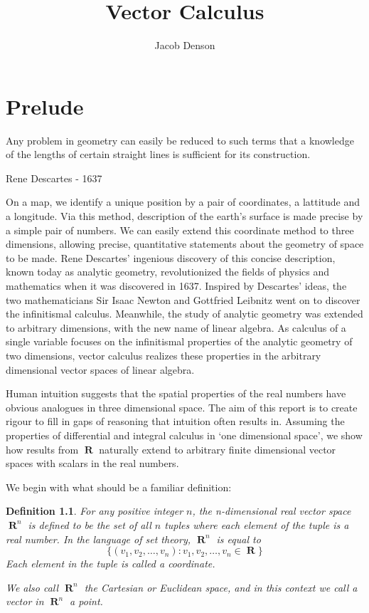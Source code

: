 \documentclass{report}
\title{Vector Calculus}
\author{Jacob Denson}
\newtheorem{definition}{Definition}
\DeclareMathOperator{\real}{\mathbf{R}}
\begin{document}
\maketitle










\chapter{Prelude}

\epigraph{Any problem in geometry can easily be reduced to such terms that a knowledge of the lengths of certain straight lines is sufficient for its construction.}{Rene Descartes - 1637}

On a map, we identify a unique position by a pair of coordinates, a lattitude and a longitude. Via this method, description of the earth's surface is made precise by a simple pair of numbers. We can easily extend this coordinate method to three dimensions, allowing precise, quantitative statements about the geometry of space to be made. Rene Descartes' ingenious discovery of this concise description, known today as analytic geometry, revolutionized the fields of physics and mathematics when it was discovered in 1637. Inspired by Descartes' ideas, the two mathematicians Sir Isaac Newton and Gottfried Leibnitz went on to discover the infinitismal calculus. Meanwhile, the study of analytic geometry was extended to arbitrary dimensions, with the new name of linear algebra. As calculus of a single variable focuses on the infinitismal properties of the analytic geometry of two dimensions, vector calculus realizes these properties in the arbitrary dimensional vector spaces of linear algebra.

Human intuition suggests that the spatial properties of the real numbers have obvious analogues in three dimensional space. The aim of this report is to create rigour to fill in gaps of reasoning that intuition often results in. Assuming the properties of differential and integral calculus in `one dimensional space', we show how results from $\real$ naturally extend to arbitrary finite dimensional vector spaces with scalars in the real numbers.

We begin with what should be a familiar definition:

\begin{definition}
  For any positive integer $n$, the n-dimensional real vector space $\real^n$ is defined to be the set of all $n$ tuples where each element of the tuple is a real number. In the language of set theory, $\real^n$ is equal to
  \[ \{ (v_1, v_2, \dots, v_n) : v_1,v_2,\dots,v_n \in \real \} \]
  Each element in the tuple is called a coordinate.

  We also call $\real^n$ the Cartesian or Euclidean space, and in this context we call a vector in $\real^n$ a point.
\end{definition}
\end{document}
